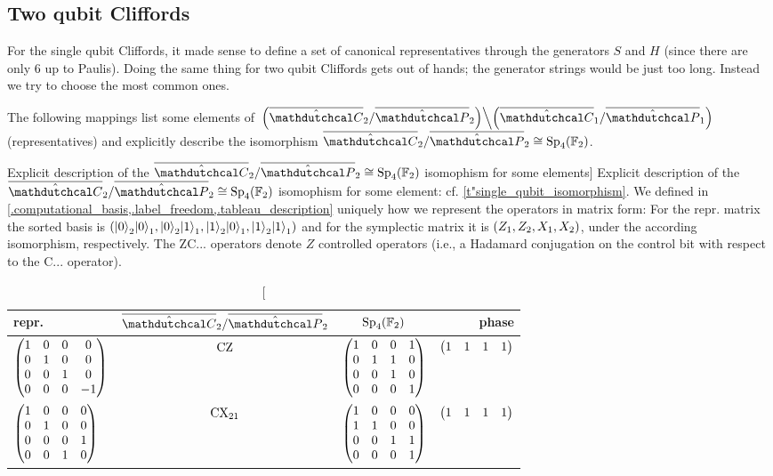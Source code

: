 \documentclass[a4paper,english]{scrartcl}
\begin{document}
\subsection{Two qubit Cliffords}

\begin{remark}
For the single qubit Cliffords, it made sense to define a set of canonical
representatives through the generators $S$ and $H$ (since there are only $6$ up to
Paulis). Doing the same thing for two qubit Cliffords gets out of hands; the generator
strings would be just too long. Instead we try to choose the most common ones.
\end{remark}
\begin{proposition}
The following mappings list some elements of
$\left.\w(\ouic_2/\ouip_2)\middle\backslash\w(\ouic_1/\ouip_1)\right.$ (representatives)
and explicitly describe the isomorphism $\ouic_2/\ouip_2 \cong \Sp_{4}\w(\F_2)$.
\begin{table}[H]\label{t"two_qubit_isomorphism}
\center
\caption
[Explicit description of the $\ouic_2/\ouip_2 \cong \Sp_{4}\w(\F_2)$ isomophism for some
elements]
{Explicit description of the $\ouic_2/\ouip_2 \cong \Sp_{4}\w(\F_2)$ isomophism for some
element: cf. \cref{t"single_qubit_isomorphism}. We defined in
\cref{.computational_basis,.label_freedom,.tableau_description} uniquely how we
represent the operators in matrix form: For the repr. matrix the sorted basis is
$\w(\er{0}_2\er{0}_1, \er{0}_2\er{1}_1, \er{1}_2\er{0}_1, \er{1}_2\er{1}_1)$ and for the
symplectic matrix it is $\w(Z_1, Z_2, X_1, X_2)$, under the according isomorphism,
respectively. The $\mathrm{ZC}...$ operators denote $Z$ controlled operators (i.e., a
Hadamard conjugation on the control bit with respect to the $\mathrm{C}...$ operator).}
\begin{tabular}{lccr}
  \toprule
  repr. & $\ouic_2/\ouip_2$ & $\Sp_{4}\w(\F_2)$ & phase\\
  \midrule
  $\begin{pmatrix}1&0&0&0\\0&1&0&0\\0&0&1&0\\0&0&0&-1\end{pmatrix}$ & $\cz$ &
  $\begin{pmatrix}1&0&0&1\\0&1&1&0\\0&0&1&0\\0&0&0&1\end{pmatrix}$ & $\begin{pmatrix}1&1&1&1\end{pmatrix}$\\
  \midrule
  $\begin{pmatrix}1&0&0&0\\0&1&0&0\\0&0&0&1\\0&0&1&0\end{pmatrix}$ & $\cx_{21}$ &
  $\begin{pmatrix}1&0&0&0\\1&1&0&0\\0&0&1&1\\0&0&0&1\end{pmatrix}$ & $\begin{pmatrix}1&1&1&1\end{pmatrix}$\\

\end{tabular}
\end{table}
\end{proposition}
\end{document}
